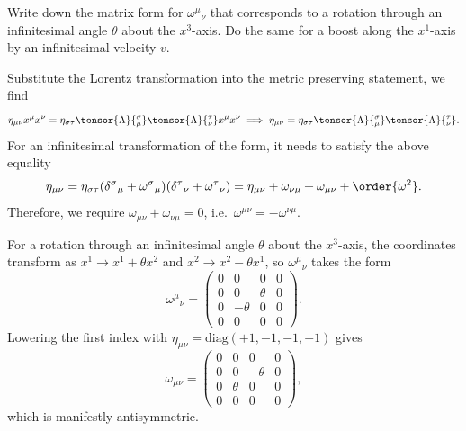 Write down the matrix form for $\omega^\mu{}_\nu$ that corresponds to a rotation through an infinitesimal angle $\theta$ about the $x^3$-axis. Do the same for a boost along the $x^1$-axis by an infinitesimal velocity $v$.
\begin{solution}
    Substitute the Lorentz transformation into the metric preserving statement, we find
    \begin{equation}
        \eta_{\mu\nu}x^\mu x^\nu = \eta_{\sigma\tau}\tensor{\Lambda}{^\sigma_\mu}\tensor{\Lambda}{^\tau_\nu}x^\mu x^\nu \implies \eta_{\mu\nu} = \eta_{\sigma\tau}\tensor{\Lambda}{^\sigma_\mu}\tensor{\Lambda}{^\tau_\nu}.
    \end{equation}
    For an infinitesimal transformation of the form, it needs to satisfy the above equality
    \begin{equation}
        \eta_{\mu\nu} = \eta_{\sigma\tau}(\delta^\sigma{}_\mu + \omega^\sigma{}_\mu)(\delta^\tau{}_\nu + \omega^\tau{}_\nu) = \eta_{\mu\nu} + \omega_{\nu\mu} + \omega_{\mu\nu} + \order{\omega^2}.
    \end{equation}
    Therefore, we require $\omega_{\mu\nu} + \omega_{\nu\mu} = 0$, i.e.\ $\omega^{\mu\nu} = -\omega^{\nu\mu}$.

    For a rotation through an infinitesimal angle $\theta$ about the $x^3$-axis, the
    coordinates transform as $x^1 \to x^1 + \theta x^2$ and $x^2 \to x^2 - \theta x^1$,
    so $\omega^\mu{}_\nu$ takes the form
    \begin{equation}
        \omega^\mu{}_\nu =
        \begin{pmatrix}
            0 & 0 & 0 & 0 \\
            0 & 0 & \theta & 0 \\
            0 & -\theta & 0 & 0 \\
            0 & 0 & 0 & 0
        \end{pmatrix}.
    \end{equation}
    Lowering the first index with $\eta_{\mu\nu} = \mathrm{diag}(+1,-1,-1,-1)$ gives
    \begin{equation}
        \omega_{\mu\nu} =
        \begin{pmatrix}
            0 & 0 & 0 & 0 \\
            0 & 0 & -\theta & 0 \\
            0 & \theta & 0 & 0 \\
            0 & 0 & 0 & 0
        \end{pmatrix},
    \end{equation}
    which is manifestly antisymmetric.


\end{solution}
